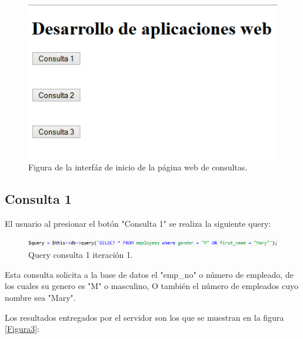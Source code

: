 \begin{figure}[htb]
	\label{Figura}
	\begin{center}
		\includegraphics[scale=0.5]{imagenes/inicio.png}
	\end{center}
	\caption{Figura de la interfáz de inicio de la página web de consultas.}
\end{figure}

\newpage

\subsection{Consulta 1}

El usuario al presionar el botón "Consulta 1" se realiza la siguiente query:

\begin{figure}[htb]
	\label{Figura2}
	\begin{center}
		\includegraphics[scale=0.7]{imagenes/query1.png}
		\caption{Query consulta 1 iteración 1.}
	\end{center}
\end{figure}

Esta consulta solicita a la base de datos el "emp\_no" o número de empleado, de los cuales su genero es "M" o masculino, O también el número de empleados cuyo nombre sea "Mary".

Los resultados entregados por el servidor son los que se muestran en la figura \ref{Figura3}:

